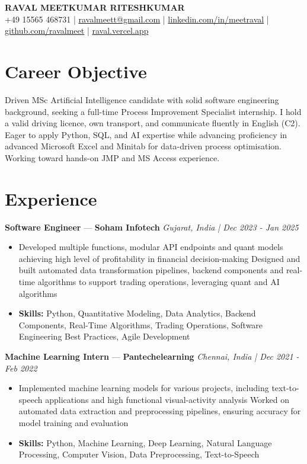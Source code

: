 \documentclass[a4paper,10pt]{article}
\begin{document}
\begin{center}
  {\Large\bfseries RAVAL MEETKUMAR RITESHKUMAR}\\[2pt]
  {\small +49 15565 468731 \;|\; \href{mailto:ravalmeett@gmail.com}{ravalmeett@gmail.com} \;|\; \href{https://www.linkedin.com/in/meetraval/}{linkedin.com/in/meetraval} \;|\; \href{https://github.com/ravalmeet}{github.com/ravalmeet} \;|\; \href{https://raval.vercel.app/}{raval.vercel.app}}
\end{center}
\vspace{-3pt}

\section*{Career Objective}
Driven MSc Artificial Intelligence candidate with solid software engineering background, seeking a full-time Process Improvement Specialist internship. I hold a valid driving licence, own transport, and communicate fluently in English (C2). Eager to apply Python, SQL, and AI expertise while advancing proficiency in advanced Microsoft Excel and Minitab for data-driven process optimisation. Working toward hands-on JMP and MS Access experience.\par

\section*{Experience}
\textbf{Software Engineer} — \textbf{Soham Infotech} \hfill \textit{Gujarat, India \;|\; Dec 2023 - Jan 2025}\par
\vspace{1pt}
\begin{itemize}
  \item Developed multiple functions, modular API endpoints and quant models achieving high level of profitability in financial decision-making Designed and built automated data transformation pipelines, backend components and real-time algorithms to support trading operations, leveraging quant and AI algorithms
  \item \textbf{Skills:} Python, Quantitative Modeling, Data Analytics, Backend Components, Real-Time Algorithms, Trading Operations, Software Engineering Best Practices, Agile Development
\end{itemize}
\vspace{3pt}
\textbf{Machine Learning Intern} — \textbf{Pantechelearning} \hfill \textit{Chennai, India \;|\; Dec 2021 - Feb 2022}\par
\vspace{1pt}
\begin{itemize}
  \item Implemented machine learning models for various projects, including text-to-speech applications and high functional visual-activity analysis Worked on automated data extraction and preprocessing pipelines, ensuring accuracy for model training and evaluation
  \item \textbf{Skills:} Python, Machine Learning, Deep Learning, Natural Language Processing, Computer Vision, Data Preprocessing, Text-to-Speech
\end{itemize}
\end{document}
